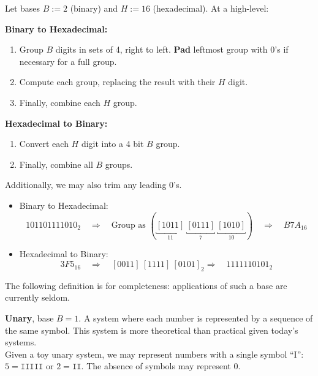 \begin{theo}

    Let bases \( B:=2 \) (binary) and \( H:=16 \) (hexadecimal). At a high-level:

    \vspace{.5em}
    
    \noindent \textbf{Binary to Hexadecimal:}
    \begin{enumerate}
        \item Group $B$ digits in sets of 4, right to left. \textbf{Pad} leftmost group with 0's if necessary for a full group.
        \item Compute each group, replacing the result with their $H$ digit.
        \item Finally, combine each $H$ group.
    \end{enumerate}
    
    \noindent \textbf{Hexadecimal to Binary:}
    \begin{enumerate}
        \item Convert each $H$ digit into a 4 bit $B$ group.
        \item Finally, combine all $B$ groups.
    \end{enumerate}
    \noindent
    Additionally, we may also trim any leading 0's.
\end{theo}

\noindent
\begin{Example}
    \begin{itemize}
        \item Binary to Hexadecimal:
        \[
        101101111010_2 \quad \Rightarrow \quad \text{Group as } (\underbracket{[1011]}_{11} \ \underbracket{[0111]}_{7} \ \underbracket{[1010]}_{10}) \quad \Rightarrow \quad B7A_{16}
        \]
        \item Hexadecimal to Binary:
        \[
        3F5_{16} \quad \Rightarrow \quad [0011]\ [1111]\ [0101]_2 \Rightarrow \quad 1111110101_2
        \]
        \noindent
    \end{itemize}

\end{Example}

\noindent
The following definition is for completeness: applications of such a base are currently seldom.
\begin{Def}[Unary]
    
    \textbf{Unary}, base $B=1$. A system where each number is represented by a sequence of the same symbol. 
    This system is more theoretical than practical given today's systems.\\

    \noindent
    Given a toy unary system, we may represent numbers with a single symbol ``I'': $5 = \texttt{IIIII}$ or $2= \texttt{II}$. 
    The absence of symbols may represent 0.
\end{Def}

